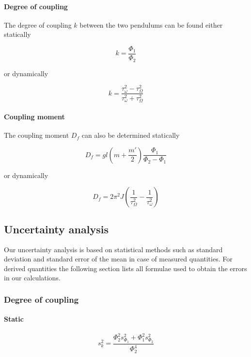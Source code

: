 \documentclass{scrreprt}
\begin{document}
\paragraph*{Degree of coupling}
The degree of coupling $k$ between the two pendulums can be found either statically

\begin{equation} \label{eq:coupconst_stat}
k = \frac{\Phi_1}{\Phi_2}
\end{equation}

or dynamically

\begin{equation} \label{eq:coupconst_dyn}
k = \frac{\tau_{\omega}^2 - \tau_{\Omega}^2}{\tau_{\omega}^2 + \tau_{\Omega}^2}
\end{equation}

\paragraph*{Coupling moment}
The coupling moment $D_f$ can also be determined statically

\begin{equation} \label{eq:coupling_stat}
D_f = g l \left( m+ \frac{m'}{2} \right) \frac{\Phi_1}{\Phi_2 -\Phi_1}
\end{equation}

or dynamically

\begin{equation} \label{eq:coupling_dyn}
D_f = 2 \pi^2 J \left( \frac{1}{\tau_{\Omega}^2} - \frac{1}{\tau_{\omega}^2}  \right) 
\end{equation}


\subsection{Uncertainty analysis}
Our uncertainty analysis is based on statistical methods such as standard deviation and standard error of the mean in case of measured quantities. For derived quantities the following section lists all formulae used to obtain the errors in our calculations.

\subsubsection{Degree of coupling}
\paragraph*{Static}
\begin{equation}
s_k^2 = \frac{\Phi_2^2 s_{\Phi_1}^2 + \Phi_1^2 s_{\Phi_2}^2}{\Phi_2^4}
\end{equation}
\end{document}
